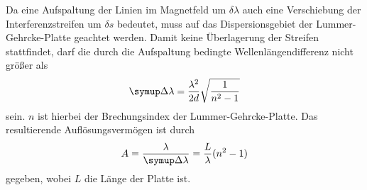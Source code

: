 Da eine Aufspaltung der Linien im Magnetfeld um $\delta\lambda$ auch eine Verschiebung der Interferenzstreifen um $\delta s$ bedeutet, muss auf das Dispersionsgebiet der Lummer-Gehrcke-Platte geachtet werden.
Damit keine Überlagerung der Streifen stattfindet, darf die durch die Aufspaltung bedingte Wellenlängendifferenz nicht größer als
%
\begin{equation}
    \upD\lambda=\frac{\lambda^2}{2d}\sqrt{\frac{1}{n^2-1}}
\end{equation}
%
sein.
$n$ ist hierbei der Brechungsindex der Lummer-Gehrcke-Platte.
Das resultierende Auflösungsvermögen ist durch
%
\begin{equation}
    A=\frac{\lambda}{\upD\lambda}=\frac{L}{\lambda}(n^2-1)
\end{equation}
%
gegeben, wobei $L$ die Länge der Platte ist.
